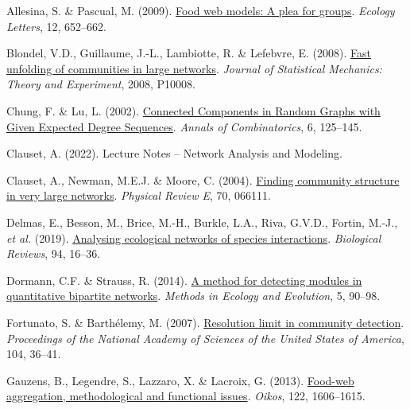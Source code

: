 \documentclass[
]{article}
\newlength{\cslhangindent}
\newlength{\cslentryspacingunit} %
\newenvironment{CSLReferences}[2] %
 {%
  \setlength{\parindent}{0pt}
  \ifodd #1
  \let\oldpar\par
  \def\par{\hangindent=\cslhangindent\oldpar}
  \fi
  \setlength{\parskip}{#2\cslentryspacingunit}
 }%
 {}
\begin{document}
\hypertarget{refs}{}
\begin{CSLReferences}{1}{0}
\leavevmode{}%
Allesina, S. \& Pascual, M. (2009).
\href{https://doi.org/10.1111/j.1461-0248.2009.01321.x}{Food web models:
A plea for groups}. \emph{Ecology Letters}, 12, 652--662.

\leavevmode{}%
Blondel, V.D., Guillaume, J.-L., Lambiotte, R. \& Lefebvre, E. (2008).
\href{https://doi.org/10.1088/1742-5468/2008/10/P10008}{Fast unfolding
of communities in large networks}. \emph{Journal of Statistical
Mechanics: Theory and Experiment}, 2008, P10008.

\leavevmode{}%
Chung, F. \& Lu, L. (2002).
\href{https://doi.org/10.1007/PL00012580}{Connected {Components} in
{Random Graphs} with {Given Expected Degree Sequences}}. \emph{Annals of
Combinatorics}, 6, 125--145.

\leavevmode{}%
Clauset, A. (2022). Lecture {Notes} -- {Network Analysis} and
{Modeling}.

\leavevmode{}%
Clauset, A., Newman, M.E.J. \& Moore, C. (2004).
\href{https://doi.org/10.1103/PhysRevE.70.066111}{Finding community
structure in very large networks}. \emph{Physical Review E}, 70, 066111.

\leavevmode{}%
Delmas, E., Besson, M., Brice, M.-H., Burkle, L.A., Riva, G.V.D.,
Fortin, M.-J., \emph{et al.} (2019).
\href{https://doi.org/10.1111/brv.12433}{Analysing ecological networks
of species interactions}. \emph{Biological Reviews}, 94, 16--36.

\leavevmode{}%
Dormann, C.F. \& Strauss, R. (2014).
\href{https://doi.org/10.1111/2041-210X.12139}{A method for detecting
modules in quantitative bipartite networks}. \emph{Methods in Ecology
and Evolution}, 5, 90--98.

\leavevmode{}%
Fortunato, S. \& Barthélemy, M. (2007).
\href{https://doi.org/10.1073/pnas.0605965104}{Resolution limit in
community detection}. \emph{Proceedings of the National Academy of
Sciences of the United States of America}, 104, 36--41.

\leavevmode{}%
Gauzens, B., Legendre, S., Lazzaro, X. \& Lacroix, G. (2013).
\href{https://www.jstor.org/stable/24567396}{Food-web aggregation,
methodological and functional issues}. \emph{Oikos}, 122, 1606--1615.


\end{CSLReferences}
\end{document}
